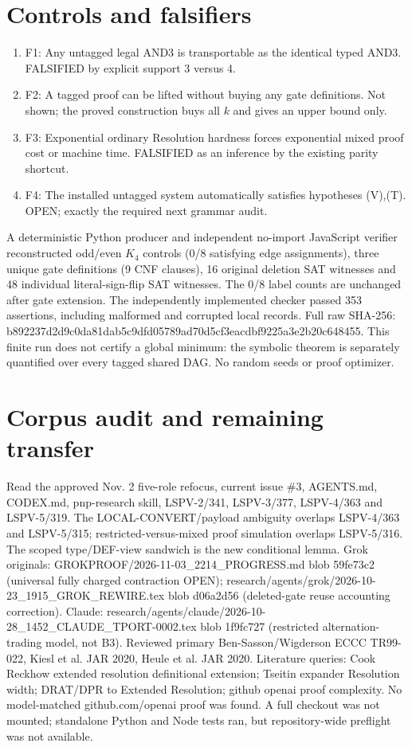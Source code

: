 \documentclass[11pt]{article}
\begin{document}
\section*{Controls and falsifiers}
\begin{enumerate}
\item[] F1: Any untagged legal AND3 is transportable as the identical typed AND3. FALSIFIED by explicit support 3 versus 4.
\item[] F2: A tagged proof can be lifted without buying any gate definitions. Not shown; the proved construction buys all $k$ and gives an upper bound only.
\item[] F3: Exponential ordinary Resolution hardness forces exponential mixed proof cost or machine time. FALSIFIED as an inference by the existing parity shortcut.
\item[] F4: The installed untagged system automatically satisfies hypotheses (V),(T). OPEN; exactly the required next grammar audit.
\end{enumerate}
A deterministic Python producer and independent no-import JavaScript verifier reconstructed odd/even $K_4$ controls (0/8 satisfying edge assignments), three unique gate definitions (9 CNF clauses), 16 original deletion SAT witnesses and 48 individual literal-sign-flip SAT witnesses. The 0/8 label counts are unchanged after gate extension. The independently implemented checker passed 353 assertions, including malformed and corrupted local records. Full raw SHA-256: b892237d2d9c0da81dab5c9dfd05789ad70d5cf3eacdbf9225a3e2b20c648455. This finite run does not certify a global minimum: the symbolic theorem is separately quantified over every tagged shared DAG. No random seeds or proof optimizer.

\section*{Corpus audit and remaining transfer}
Read the approved Nov. 2 five-role refocus, current issue \#3, AGENTS.md, CODEX.md, pnp-research skill, LSPV-2/341, LSPV-3/377, LSPV-4/363 and LSPV-5/319. The LOCAL-CONVERT/payload ambiguity overlaps LSPV-4/363 and LSPV-5/315; restricted-versus-mixed proof simulation overlaps LSPV-5/316. The scoped type/DEF-view sandwich is the new conditional lemma. Grok originals: GROKPROOF/2026-11-03\_2214\_PROGRESS.md blob 59fe73c2 (universal fully charged contraction OPEN); research/agents/grok/2026-10-23\_1915\_GROK\_REWIRE.tex blob d06a2d56 (deleted-gate reuse accounting correction). Claude: research/agents/claude/2026-10-28\_1452\_CLAUDE\_TPORT-0002.tex blob 1f9fc727 (restricted alternation-trading model, not B3). Reviewed primary Ben-Sasson/Wigderson ECCC TR99-022, Kiesl et al. JAR 2020, Heule et al. JAR 2020. Literature queries: Cook Reckhow extended resolution definitional extension; Tseitin expander Resolution width; DRAT/DPR to Extended Resolution; github openai proof complexity. No model-matched github.com/openai proof was found. A full checkout was not mounted; standalone Python and Node tests ran, but repository-wide preflight was not available.
\end{document}
